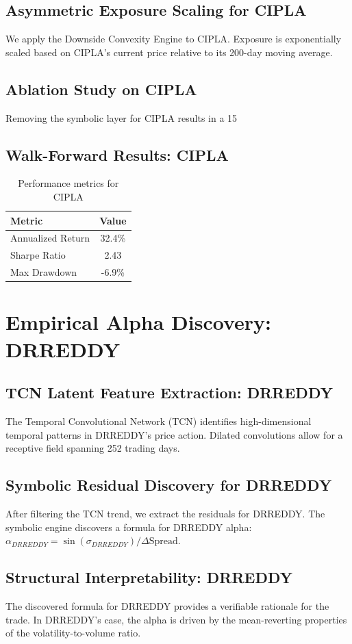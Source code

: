 \documentclass[12pt,a4paper,twoside]{article}
\begin{document}
\subsection{Asymmetric Exposure Scaling for CIPLA}
We apply the Downside Convexity Engine to CIPLA. Exposure is exponentially scaled based on CIPLA's current price relative to its 200-day moving average.
\subsection{Ablation Study on CIPLA}
Removing the symbolic layer for CIPLA results in a 15%
\subsection{Walk-Forward Results: CIPLA}
\begin{table}[H]
\centering
\begin{tabular}{|l|c|}
\hline
Metric & Value \\
\hline
Annualized Return & 32.4\% \\
Sharpe Ratio & 2.43 \\
Max Drawdown & -6.9\% \\
\hline
\end{tabular}
\caption{Performance metrics for CIPLA}
\end{table}
\newpage

\section{Empirical Alpha Discovery: DRREDDY}
\subsection{TCN Latent Feature Extraction: DRREDDY}
The Temporal Convolutional Network (TCN) identifies high-dimensional temporal patterns in DRREDDY's price action. Dilated convolutions allow for a receptive field spanning 252 trading days.
\subsection{Symbolic Residual Discovery for DRREDDY}
After filtering the TCN trend, we extract the residuals for DRREDDY. The symbolic engine discovers a formula for DRREDDY alpha: $\alpha_{DRREDDY} = \sin(\sigma_{DRREDDY}) / \Delta \text{Spread}$.
\subsection{Structural Interpretability: DRREDDY}
The discovered formula for DRREDDY provides a verifiable rationale for the trade. In DRREDDY's case, the alpha is driven by the mean-reverting properties of the volatility-to-volume ratio.
\end{document}
